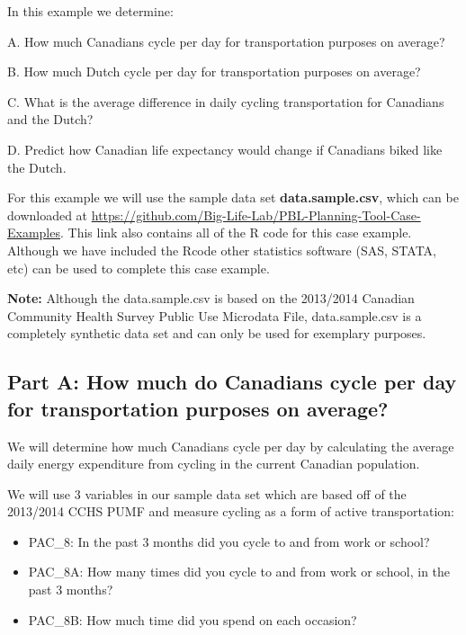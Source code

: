 \documentclass[]{book}
\providecommand{\tightlist}{%
  \setlength{\itemsep}{0pt}\setlength{\parskip}{0pt}}
\begin{document}
In this example we determine:

A. How much Canadians cycle per day for transportation purposes on average?

B. How much Dutch cycle per day for transportation purposes on average?

C. What is the average difference in daily cycling transportation for Canadians and the Dutch?

D. Predict how Canadian life expectancy would change if Canadians biked like the Dutch.

For this example we will use the sample data set \textbf{data.sample.csv}, which can be downloaded at \url{https://github.com/Big-Life-Lab/PBL-Planning-Tool-Case-Examples}. This link also contains all of the R code for this case example. Although we have included the Rcode other statistics software (SAS, STATA, etc) can be used to complete this case example.

\textbf{Note:} Although the data.sample.csv is based on the 2013/2014 Canadian Community Health Survey Public Use Microdata File, data.sample.csv is a completely synthetic data set and can only be used for exemplary purposes.

\hypertarget{part-a-how-much-do-canadians-cycle-per-day-for-transportation-purposes-on-average}{%
\subsection{Part A: How much do Canadians cycle per day for transportation purposes on average?}\label{part-a-how-much-do-canadians-cycle-per-day-for-transportation-purposes-on-average}}

We will determine how much Canadians cycle per day by calculating the average daily energy expenditure from cycling in the current Canadian population.

We will use 3 variables in our sample data set which are based off of the 2013/2014 CCHS PUMF and measure cycling as a form of active transportation:

\begin{itemize}
\tightlist
\item
  PAC\_8: In the past 3 months did you cycle to and from work or school?
\item
  PAC\_8A: How many times did you cycle to and from work or school, in the past 3 months?
\item
  PAC\_8B: How much time did you spend on each occasion?
\end{itemize}
\end{document}
